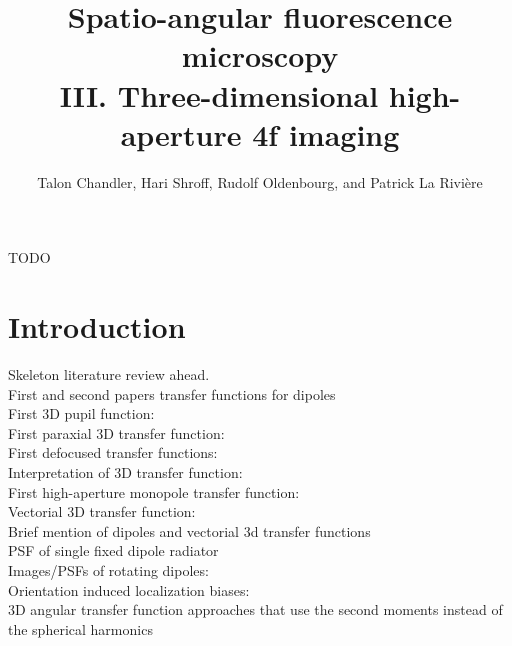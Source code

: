 \documentclass[]{osa-article}
\begin{document}
\title{Spatio-angular fluorescence microscopy\\ III. Three-dimensional high-aperture 4f imaging}

\author{Talon Chandler, Hari Shroff, Rudolf Oldenbourg, and Patrick La Rivi\`ere}

\address{University of Chicago, Department of Radiology, Chicago, Illinois 60637, USA\\
  Section on High Resolution Optical Imaging, National Institute of Biomedical Imaging and Bioengineering, National Institutes of Health, Bethesda, Maryland 20892, USA\\
  Marine Biological Laboratory, Bell Center, Woods Hole, Massachusetts 02543, USA}


\begin{abstract*}
  TODO
\end{abstract*}

\section{Introduction}
\noindent Skeleton literature review ahead. \\

\noindent First and second papers transfer functions for dipoles \cite{chandler2019a, chandler2019b}\\

\noindent First 3D pupil function: \cite{mccutchen1964}\\
First paraxial 3D transfer function: \cite{frieden1967}\\
First defocused transfer functions: \cite{stokseth1969}\\
Interpretation of 3D transfer function: \cite{sheppard1989}\\
First high-aperture monopole transfer function: \cite{sheppard1994}\\
Vectorial 3D transfer function: \cite{sheppard1997a, philip1999, arnison2002, schonle2002}\\
Brief mention of dipoles and vectorial 3d transfer functions \cite{sheppard1997b, schonle2002}\\

\noindent PSF of single fixed dipole radiator \cite{sheppard1997b, nov2006, sick2000, bohmer2003, patra2004, toprak2006, backer2014, khadir2019}\\
Images/PSFs of rotating dipoles: \cite{lew2013, backlund2014, backer2015, stallinga2015, backer2019}\\
Orientation induced localization biases: \cite{engelhardt2011, stallinga2012, backlund2014}\\
3D angular transfer function approaches that use the second moments instead of the spherical harmonics \cite{aguet2009a, backer2014, brasselet2011, zhang2018a, zhang2018b}\\
\end{document}

